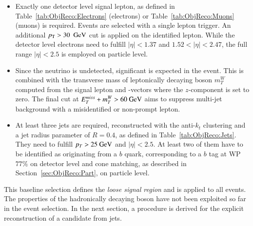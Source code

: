 \begin{itemize}
    \item Exactly one detector level signal lepton, as defined in Table~\ref{tab:ObjReco:Electrons} (electrons) or Table~\ref{tab:ObjReco:Muons} (muons) is required.
    Events are selected with a single lepton trigger. An additional $p_{\text{T}} > 30~~\text{GeV}$ cut is applied on the identified lepton.
    While the detector level electrons need to fulfill $|\eta|<1.37$ and $1.52<|\eta|<2.47$, the full range $|\eta| < 2.5$ is employed on particle level.
    \item Since the neutrino is undetected, significant \ETmiss is expected in the event.
    This is combined with the transverse mass of leptonically decaying \Wboson boson $m_T^W$ computed from the signal lepton and
    -vectors where the $z$-component is set to zero.
    The final cut at $E_T^{miss} + m_T^W > 60 ~\text{GeV}$ aims to suppress multi-jet background with a misidentified or non-prompt lepton.
    \item At least three jets are required, reconstructed with the anti-$k_t$ clustering and a jet radius parameter of $R=0.4$, as defined in Table~\ref{tab:ObjReco:Jets}.
    They need to fulfill $p_T > 25 ~\text{GeV}$ and $|\eta|<2.5$. At least two of them have to be identified as originating from a $b$ quark, corresponding to a $b$ tag at WP $77\%$ on detector level and cone matching, as described in Section~\ref{sec:ObjReco:Part}, on particle level.
\end{itemize}

\noindent
This baseline selection defines the \textit{loose signal region} and is applied to all events.
The properties of the hadronically decaying \Wboson boson have not been exploited so far in the event selection.
In the next section, a procedure is derived for the explicit reconstruction of a \Whad candidate from jets.

